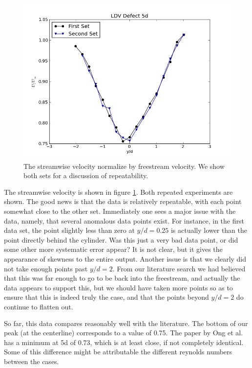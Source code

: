 \documentclass{article}
\begin{document}
\begin{figure}[!htb]
 \begin{center}
  \includegraphics[width = 12 cm]{figs/defect}
  \caption{The streamwise velocity normalize by freestream velocity. We
  show both sets for a discussion of repeatability.}
  \label{repeat}
 \end{center}
\end{figure}

The streamwise velocity is shown in figure \ref{repeat}. Both repeated
experiments are shown. The good news is that the data is relatively
repeatable, with each point somewhat close to the other set. 
Immediately one sees a major issue with the data,
namely, that several anomalous data points exist. For instance, in the
first data set, the point slightly less than zero at $y/d=0.25$ is
actually lower than the point directly behind the cylinder. Was this
just a very bad data point, or did some other more systematic error
appear? It is not clear, but it gives the appearance of skewness to the
entire output. Another issue is that we clearly did not take enough
points past $y/d=2$. From our literature search we had believed that
this was far enough to go to be back into the freestream, and actually
the data appears to support this, but we should have taken more points
so as to ensure that this is indeed truly the case, and that the points
beyond $y/d=2$ do continue to flatten out.

So far, this data compares reasonably well with the literature. The
bottom of our peak (at the centerline) corresponds to a value of
0.75. The paper by Ong et al. has a minimum at 5d of 0.73, which is at
least close, if not completely identical. Some of this difference might
be attributable the different reynolds numbers between the cases. 
\end{document}
